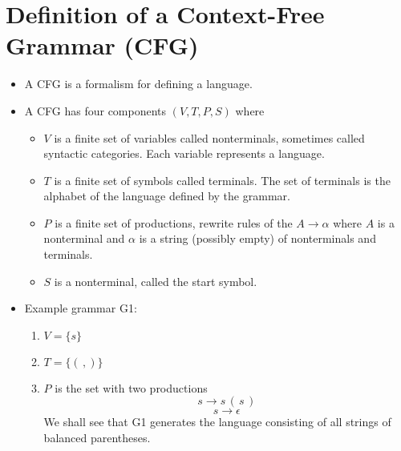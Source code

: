 \documentclass[]{article}
\begin{document}
\section{Definition of a Context-Free Grammar (CFG)}
  \begin{itemize}
    \item A CFG is a formalism for defining a language.
    \item A CFG has four components $(V, T, P, S)$ where
      \begin{itemize}
        \item $V$ is a finite set of variables called nonterminals, sometimes 
        called syntactic categories. Each variable represents a language.
        \item $T$ is a finite set of symbols called terminals. The set of 
        terminals is the alphabet of the language defined by the grammar.
        \item $P$ is a finite set of productions, rewrite rules of the $A 
        \rightarrow \alpha$ where $A$ is a nonterminal and $\alpha$ is a string
        (possibly empty) of nonterminals and terminals.
        \item $S$ is a nonterminal, called the start symbol.
      \end{itemize}
    \item Example grammar G1:
      \begin{enumerate}
        \item $V = \{ s \}$
        \item $T = \{ ( \, ,) \}$
        \item $P$ is the set with two productions
          \[ s \rightarrow s \, ( \, s \, ) \]
          \[ s \rightarrow \epsilon \]
        We shall see that G1 generates the language consisting of all strings of
        balanced parentheses.
      \end{enumerate}
  \end{itemize}
\end{document}
